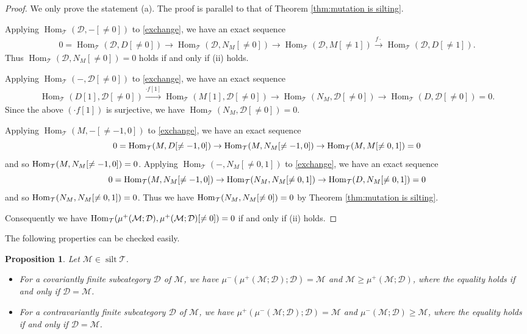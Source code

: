 \documentclass[a4paper,reqno]{amsart}
\newtheorem{proposition}[theorem]{Proposition}
\theoremstyle{definition}
\newcommand{\DD}{{\mathcal D}}
\newcommand{\TT}{{\mathcal T}}
\newcommand{\MM}{{\mathcal M}}
\newcommand{\XX}{{\mathcal X}}
\newcommand{\Hom}{\operatorname{Hom}\nolimits}
\newcommand{\silt}{\operatorname{silt}\nolimits}
\newcommand{\homo}[3]{{\rm{Hom}}_{#1}(#2, #3)} %
\begin{document}
\begin{proof}
We only prove the statement (a). 
The proof is parallel to that of Theorem \ref{thm:mutation is silting}.

Applying $\Hom_{\TT}(\DD,-[\neq0])$ to \eqref{exchange}, we have an exact sequence
\begin{eqnarray*}%
0=\Hom_{\TT}(\DD,D[\neq0])\to\Hom_{\TT}(\DD,N_M[\neq0])\to\Hom_{\TT}(\DD,M[\neq1])\xrightarrow{f\cdot}\Hom_{\TT}(\DD,D[\neq1]).
\end{eqnarray*}
Thus $\Hom_{\TT}(\DD,N_M[\neq0])=0$ holds if and only if (ii) holds.

Applying $\Hom_{\TT}(-,\DD[\neq0])$ to \eqref{exchange}, we have an exact sequence
\begin{eqnarray*}%
\Hom_{\TT}(D[1],\DD[\neq0])\xrightarrow{\cdot f[1]}
\Hom_{\TT}(M[1],\DD[\neq0])\to\Hom_{\TT}(N_M,\DD[\neq0])\to\Hom_{\TT}(D,\DD[\neq0])=0.
\end{eqnarray*}
Since the above $(\cdot f[1])$ is surjective, we have $\Hom_{\TT}(N_M,\DD[\neq0])=0$.


Applying $\Hom_{\TT}(M,-[\neq-1,0])$ to \eqref{exchange}, we have an exact sequence 
\[0=\homo{\TT}{M}{D[\neq-1,0]}\to \homo{\TT}{M}{N_M[\neq-1,0]}\to \homo{\TT}{M}{M[\neq0,1]}=0\]
and so $\homo{\TT}{M}{N_M[\neq-1,0]}=0$. 
Applying $\Hom_{\TT}(-,N_M[\neq0,1])$ to \eqref{exchange}, we have an exact sequence 
\[0=\homo{\TT}{M}{N_M[\neq-1,0]}\to \homo{\TT}{N_M}{N_M[\neq0,1]}\to \homo{\TT}{D}{N_M[\neq0,1]}=0\]
and so $\homo{\TT}{N_M}{N_M[\neq0,1]}=0$. 
Thus we have $\homo{\TT}{N_M}{N_M[\neq0]}=0$ by Theorem \ref{thm:mutation is silting}.

Consequently we have $\homo{\TT}{\mu^+(\MM;\DD)}{\mu^+(\MM;\DD)[\neq0]}=0$
if and only if (ii) holds. 
\end{proof}

The following properties can be checked easily.

\begin{proposition}\label{mutation basic}
Let $\MM\in\silt\TT$.
\begin{itemize}
\item[(a)] For a covariantly finite subcategory $\DD$ of $\MM$,
we have $\mu^-(\mu^+(\MM;\DD);\DD)=\MM$ and $\MM\ge\mu^+(\MM;\DD)$, where the equality holds if and only if $\DD=\MM$.
\item[(b)] For a contravariantly finite subcategory $\DD$ of $\MM$,
we have $\mu^+(\mu^-(\MM;\DD);\DD)=\MM$ and $\mu^-(\MM;\DD)\ge\MM$, where the equality holds if and only if $\DD=\MM$.
\end{itemize}
\end{proposition}
\end{document}
